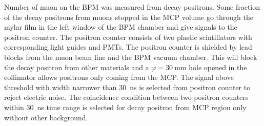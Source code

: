 \documentclass[preprint,3p,twocolumn]{elsarticle}
\begin{document}
Number of muon on the BPM was measured from decay positrons.
Some fraction of the decay positrons from muons stopped in the MCP volume go through the mylar film in the left window of the BPM chamber and give signals to the positron counter. 
The positron counter consists of two plastic scintillators with corresponding light guides and PMTs. %
The positron counter is shielded by lead blocks from the muon beam line and the BPM vacuum chamber. This will block the decay positron from other materials and a $\varphi = \SI{30}{\mm}$ hole opened in the collimator allows positrons only coming from the MCP.
The signal above threshold with width narrower than \SI{30}{\ns} is selected from positron counter to reject electric noise. 
The coincidence condition between two positron counters within \SI{30}{\ns} time range is selected for decay positron from MCP region only without other background.
\end{document}
